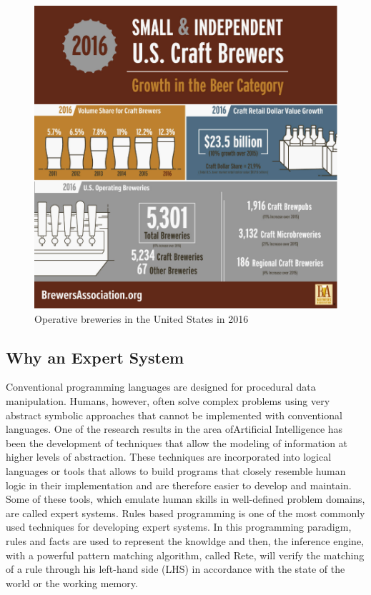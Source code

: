 \documentclass[12pt]{article}
\begin{document}
\begin{figure}[h]
\centering
\includegraphics[scale = 0.4]{img/brewers.png}
\caption{Operative breweries in the United States in 2016}
\end{figure}

\subsection{Why an Expert System}
Conventional programming languages ​​are designed for procedural data manipulation. Humans, however, often solve complex problems using very abstract symbolic approaches that cannot be implemented with conventional languages. One of the research results in the area of ​​Artificial Intelligence has been the development of techniques that allow the modeling of information at higher levels of abstraction. These techniques are incorporated into logical languages ​​or tools that allows to build programs that closely resemble human logic in their implementation and are therefore easier to develop and maintain. Some of these tools, which emulate human skills in well-defined problem domains, are called expert systems. Rules based programming is one of the most commonly used techniques for developing expert systems. In this programming paradigm, rules and facts are used to represent the knowldge and then, the inference engine, with a powerful pattern matching algorithm, called Rete, will verify the matching of a rule through his left-hand side (LHS) in accordance with the state of the world or the working memory.
\end{document}
